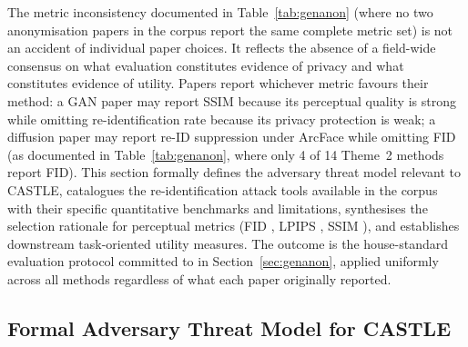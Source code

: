 \documentclass[12pt, onecolumn]{IEEEtran}
\begin{document}
The metric inconsistency documented in Table~\ref{tab:genanon} (where no
two anonymisation papers in the corpus report the same complete metric
set) is not an accident of individual paper choices. It reflects the
absence of a field-wide consensus on what evaluation constitutes
evidence of privacy and what constitutes evidence of utility. Papers
report whichever metric favours their method: a GAN paper may report
SSIM because its perceptual quality is strong while omitting
re-identification rate because its privacy protection is weak; a
diffusion paper may report re-ID suppression under ArcFace while
omitting FID (as documented in Table~\ref{tab:genanon}, where only 4 of
14 Theme~2 methods report FID). This section formally defines the
adversary threat model relevant to CASTLE, catalogues the
re-identification attack tools available in the corpus with their
specific quantitative benchmarks and limitations, synthesises the
selection rationale for perceptual metrics (FID \cite{heusel2017fid},
LPIPS \cite{zhang2018lpips}, SSIM \cite{wang2004ssim}), and establishes
downstream task-oriented utility measures. The outcome is the
house-standard evaluation protocol committed to in
Section~\ref{sec:genanon}, applied uniformly across all methods
regardless of what each paper originally reported.

\subsection{Formal Adversary Threat Model for CASTLE}
\end{document}
